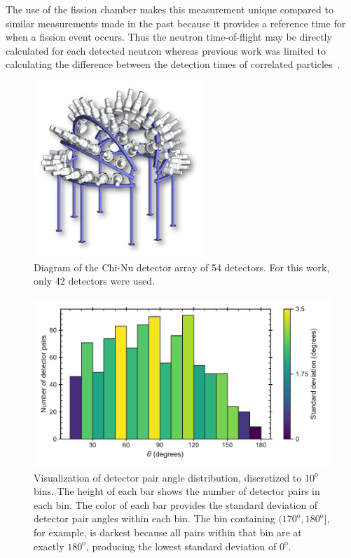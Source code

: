 \documentclass[preprint,12pt]{elsarticle}
\newcommand{\degrees}[1]{\ensuremath{#1^{\mathrm{o}}}\xspace}
\begin{document}
The use of the fission chamber makes this measurement unique compared to similar measurements made in the past because it provides a reference time for when a fission event occurs. Thus the neutron time-of-flight may be directly calculated for each detected neutron whereas previous work was limited to calculating the difference between the detection times of correlated particles~\cite{Larsen2014}.  



\begin{figure}[h]
	\centering\includegraphics[scale=1]{setup.png}
	\caption{Diagram of the Chi-Nu detector array of 54 detectors. For this work, only 42 detectors were used.}
	\label{fig:chi_nu_diagram}
\end{figure}

\begin{figure}[!t]
	\centering
	\includegraphics[trim={0cm 0cm 0cm 0cm},clip,width=.75\linewidth]{det_df_histogram.pdf}%
	
	\caption{Visualization of detector pair angle distribution, discretized to \degrees{10} bins. The height of each bar shows the number of detector pairs in each bin. The color of each bar provides the standard deviation of detector pair angles within each bin. The bin containing $(\degrees{170},\degrees{180}]$, for example, is darkest because all pairs within that bin are at exactly \degrees{180}, producing the lowest standard deviation of \degrees{0}.}
	\label{fig:det_df}
\end{figure}
\end{document}
